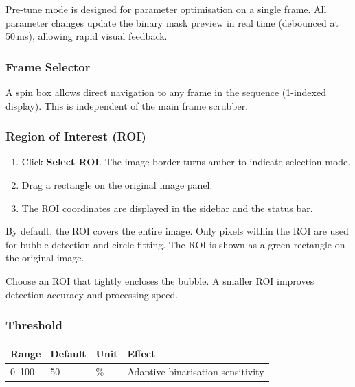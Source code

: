 \documentclass[11pt, letterpaper]{article}
\begin{document}
Pre-tune mode is designed for parameter optimisation on a single frame. All
parameter changes update the binary mask preview in real time (debounced at
50\,ms), allowing rapid visual feedback.

\subsubsection{Frame Selector}

A spin box allows direct navigation to any frame in the sequence (1-indexed
display). This is independent of the main frame scrubber.

\subsubsection{Region of Interest (ROI)}

\begin{enumerate}
    \item Click \textbf{Select ROI}. The image border turns amber to indicate
          selection mode.
    \item Drag a rectangle on the original image panel.
    \item The ROI coordinates are displayed in the sidebar and the status bar.
\end{enumerate}

By default, the ROI covers the entire image. Only pixels within the ROI are
used for bubble detection and circle fitting. The ROI is shown as a green
rectangle on the original image.

\begin{tipbox}[Tip]
    Choose an ROI that tightly encloses the bubble. A smaller ROI improves
    detection accuracy and processing speed.
\end{tipbox}

\subsubsection{Threshold}

\begin{center}
\begin{tabular}{llll}
    \toprule
    \textbf{Range} & \textbf{Default} & \textbf{Unit} & \textbf{Effect} \\
    \midrule
    0--100 & 50 & \% & Adaptive binarisation sensitivity \\
    \bottomrule
\end{tabular}
\end{center}
\end{document}
